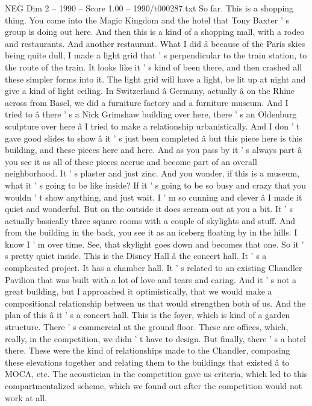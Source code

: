 \begin{textsample}{NEG Dim 2 – 1990 – Score 1.00 – 1990/t000287.txt}
So far.
This is a shopping thing.
You come into the Magic Kingdom and the hotel that Tony Baxter ' s group is doing out here.
And then this is a kind of a shopping mall, with a rodeo and restaurants.
And another restaurant.
What I did â because of the Paris skies being quite dull, I made a light grid that ' s perpendicular to the train station, to the route of the train.
It looks like it ' s kind of been there, and then crashed all these simpler forms into it.
The light grid will have a light, be lit up at night and give a kind of light ceiling.
In Switzerland â Germany, actually â on the Rhine across from Basel, we did a furniture factory and a furniture museum.
And I tried to â there ' s a Nick Grimshaw building over here, there ' s an Oldenburg sculpture over here â I tried to make a relationship urbanistically.
And I don ' t gave good slides to show â it ' s just been completed â but this piece here is this building, and these pieces here and here.
And as you pass by it ' s always part â you see it as all of these pieces accrue and become part of an overall neighborhood.
It ' s plaster and just zinc.
And you wonder, if this is a museum, what it ' s going to be like inside?
If it ' s going to be so busy and crazy that you wouldn ' t show anything, and just wait.
I ' m so cunning and clever â I made it quiet and wonderful.
But on the outside it does scream out at you a bit.
It ' s actually basically three square rooms with a couple of skylights and stuff.
And from the building in the back, you see it as an iceberg floating by in the hills.
I know I ' m over time.
See, that skylight goes down and becomes that one.
So it ' s pretty quiet inside.
This is the Disney Hall â the concert hall.
It ' s a complicated project.
It has a chamber hall.
It ' s related to an existing Chandler Pavilion that was built with a lot of love and tears and caring.
And it ' s not a great building, but I approached it optimistically, that we would make a compositional relationship between us that would strengthen both of us.
And the plan of this â it ' s a concert hall.
This is the foyer, which is kind of a garden structure.
There ' s commercial at the ground floor.
These are offices, which, really, in the competition, we didn ' t have to design.
But finally, there ' s a hotel there.
These were the kind of relationships made to the Chandler, composing these elevations together and relating them to the buildings that existed â to MOCA, etc.
The acoustician in the competition gave us criteria, which led to this compartmentalized scheme, which we found out after the competition would not work at all.

\end{textsample}

